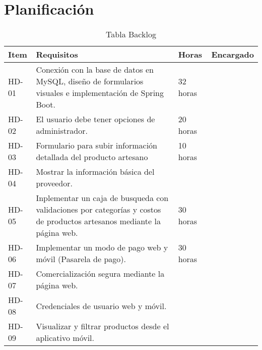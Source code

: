 \chapter{Planificación}


\begin{table}[htbp]
	\begin{center}
		\begin{tabular}{|p{2.5cm}|p{6.5cm}|p{2.5cm}|p{2.5cm}|}
			\hline
			Item & Requisitos & Horas & Encargado\\
			\hline \hline
			HD-01 & Conexión con la base de datos en MySQL, diseño de formularios visuales e implementación de Spring Boot. & 32 horas & \\ \hline
			HD-02 & El usuario debe tener opciones de administrador. & 20 horas & \\ \hline
			HD-03 & Formulario para subir información detallada del producto artesano & 10 horas  & \\ \hline
			HD-04 & Mostrar la información básica del proveedor. &  & \\ \hline
			HD-05 & Inplementar un caja de busqueda con validaciones por categorías y costos de productos artesanos mediante la página web. & 30 horas & \\ \hline
			HD-06 & Implementar un modo de pago web y móvil (Pasarela de pago). & 30 horas & \\ \hline
			HD-07 & Comercialización segura mediante la página web. &  & \\ \hline
			HD-08 & Credenciales de usuario web y móvil. &  & \\ \hline
			HD-09 & Visualizar y filtrar productos desde el aplicativo móvil. &  & \\ \hline			
			
			
		\end{tabular}
		\caption{Tabla Backlog}
		\label{tabla:sencilla}
	\end{center}
\end{table}